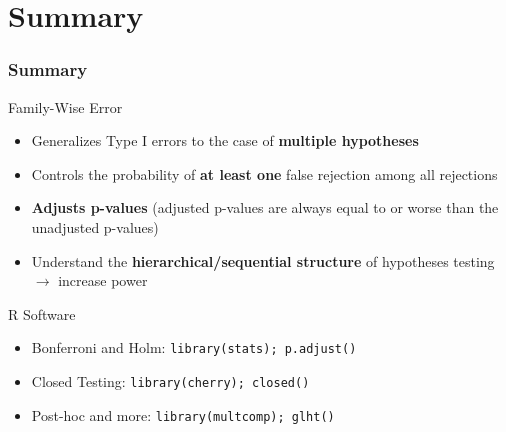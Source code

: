 \documentclass[xcolor={dvipsnames}]{beamer}
\newcommand{\bb}[1]{\begin{block}{#1}}
\newcommand{\eb}{\end{block}}
\newcommand{\bi}{\begin {itemize}}
\newcommand{\ei}{\end{itemize}}
\newcommand{\bfr}[1]{\begin{frame} \frametitle{#1}}
\begin{document}
\section{Summary}
\bfr{Summary}
\bb{Family-Wise Error}
\bi
\item Generalizes Type I errors to the case of \textbf{multiple hypotheses}
\pause
\item Controls the probability of \textbf{at least one} false rejection among all rejections
\pause
\item \textbf{Adjusts p-values} (adjusted p-values are always equal to or worse than the unadjusted p-values)
\pause
\item Understand the \textbf{hierarchical/sequential structure} of hypotheses testing $\rightarrow$ increase power
\ei
\eb
\pause
\bb{R Software}
\bi
\item Bonferroni and Holm: {\tt library(stats); p.adjust()}
\item Closed Testing: {\tt library(cherry); closed()}
\item Post-hoc and more: {\tt library(multcomp); glht()}
\ei
\eb
\end{frame}
\end{document}
